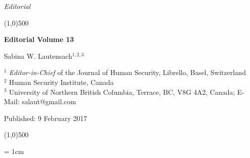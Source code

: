 \documentclass[10pt,a4paper]{article}
\begin{document}
\flushcolumns
\raggedcolumns

\pagestyle{document}
\thispagestyle{firstpage}

\vspace*{70pt}

\setlength{\parindent}{0cm}
\textit{Editorial}
\vspace*{-12pt}

\begin{center}
\line(1,0){500}
\end{center}

\vspace*{12pt}
\begin{flushleft}
\begin{LARGE}
\textbf{{\color{LibrelloColor} Editorial Volume 13}}\\
\end{LARGE}

\vspace*{12pt}

Sabina W. Lautensach$^{1,2,3}$

\vspace*{6pt}

$^{1}$ \textit{Editor-in-Chief} of the Journal of Human Security, Librello, Basel, Switzerland\\
$^{2}$ Human Security Institute, Canada\\
$^{3}$ University of Northern British Columbia, Terrace, BC, V8G 4A2, Canada; E-Mail: salaut@gmail.com

\vspace*{6pt}

%

Published: 9 February 2017
\end{flushleft}


\vspace*{-18pt}
\begin{center}
\line(1,0){500}
\end{center}

\vspace*{12pt}

\begingroup\leftskip= 1cm\rightskip 1cm  
\end{document}
